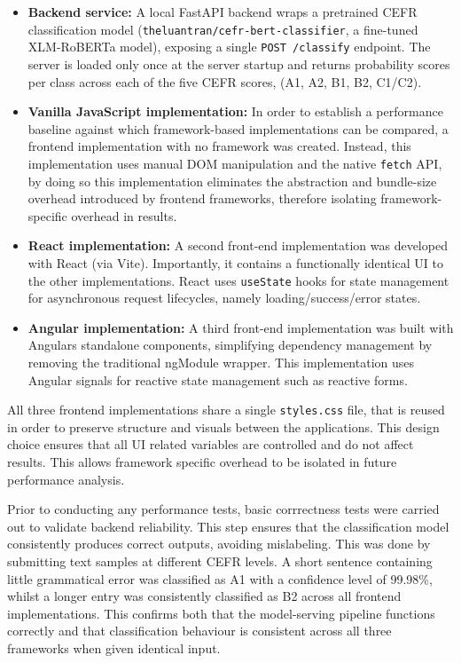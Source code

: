\documentclass[conference]{IEEEtran}
\begin{document}
\begin{itemize}
\item \textbf{Backend service:} A local FastAPI backend wraps a pretrained CEFR classification model (\texttt{theluantran/cefr-bert-classifier}, a fine-tuned XLM-RoBERTa model), exposing a single \texttt{POST /classify} endpoint. The server is loaded only once at the server startup and returns probability scores per class across each of the five CEFR scores, (A1, A2, B1, B2, C1/C2).
\medskip 
\item \textbf{Vanilla JavaScript implementation:} In order to establish a performance baseline against which framework-based implementations can be compared, a frontend implementation with no framework was created. Instead, this implementation uses manual DOM manipulation and the native \texttt{fetch} API, by doing so this implementation eliminates the abstraction and bundle-size overhead introduced by frontend frameworks, therefore isolating framework-specific overhead in results. 
\medskip
\item \textbf{React implementation:} A second front-end implementation was developed with React (via Vite). Importantly, it contains a functionally identical UI to the other implementations. React uses \texttt{useState} hooks for state management for asynchronous request lifecycles, namely loading/success/error states.
\medskip
\item \textbf{Angular implementation:} A third front-end implementation was built with Angulars standalone components, simplifying dependency management by removing the traditional ngModule wrapper. This implementation uses Angular signals for reactive state management such as reactive forms. 
\end{itemize}

\medskip

All three frontend implementations share a single \texttt{styles.css} file, that is reused in order to preserve structure and visuals between the applications. This design choice ensures that all UI related variables are controlled and do not affect results. This allows framework specific overhead to be isolated in future performance analysis. 

\medskip  

Prior to conducting any performance tests, basic corrrectness tests were carried out to validate backend reliability. This step ensures that the classification model consistently produces correct outputs, avoiding mislabeling. This was done by submitting text samples at different CEFR levels. A short sentence containing little grammatical error was classified as A1 with a confidence level of 99.98\%, whilst a longer entry was consistently classified as B2 across all frontend implementations. This confirms both that the
model-serving pipeline functions correctly and that classification behaviour is consistent across all three frameworks when given identical input.
\end{document}
